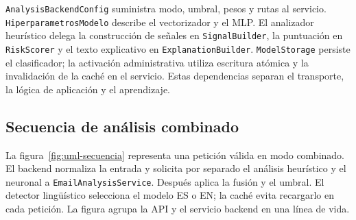 \nolinkurl{AnalysisBackendConfig} suministra modo, umbral, pesos y rutas al servicio. \nolinkurl{HiperparametrosModelo} describe el vectorizador y el MLP. El analizador heurístico delega la construcción de señales en \nolinkurl{SignalBuilder}, la puntuación en \nolinkurl{RiskScorer} y el texto explicativo en \nolinkurl{ExplanationBuilder}. \nolinkurl{ModelStorage} persiste el clasificador; la activación administrativa utiliza escritura atómica y la invalidación de la caché en el servicio. Estas dependencias separan el transporte, la lógica de aplicación y el aprendizaje.

\clearpage
\subsection{Secuencia de análisis combinado}
La figura~\ref{fig:uml-secuencia} representa una petición válida en modo combinado. El backend normaliza la entrada y solicita por separado el análisis heurístico y el neuronal a \nolinkurl{EmailAnalysisService}. Después aplica la fusión y el umbral. El detector lingüístico selecciona el modelo ES o EN; la caché evita recargarlo en cada petición. La figura agrupa la API y el servicio backend en una línea de vida.

